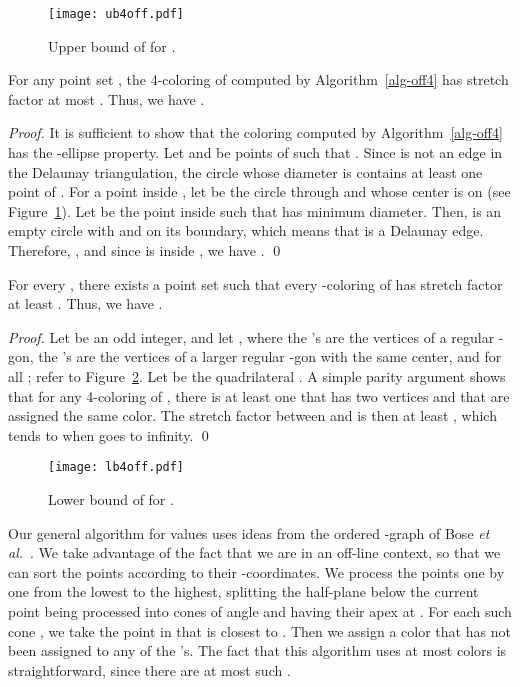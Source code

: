 \documentclass[pdftex,leqno,fleqn,12pts]{llncs}
\begin{document}
\begin{figure}
\centering\texttt{[image: ub4off.pdf]}\caption{Upper bound of  for
.}\label{fig-ub4off}
\end{figure}


\begin{lemma}    \label{prop-ub4off} 
For any point set , the 4-coloring of  computed by 
Algorithm~\ref{alg-off4} has stretch factor at most . 
Thus, we have .
\end{lemma}
\begin{proof}
It is sufficient to show that the coloring  computed by
Algorithm~\ref{alg-off4} has the -ellipse property. 
Let  and  be points of  such that . Since 
is not an edge in the Delaunay triangulation, the circle  whose 
diameter is  contains at least one point of . For a point  
inside , let  be the circle through  and  whose center 
is on  (see Figure~\ref{fig-ub4off}). Let  be the point inside 
 such that  has minimum diameter. Then,  is an empty
circle with  and  on its boundary, which means that 
is a Delaunay edge. Therefore, , and since  is
inside , we have .
\qed 
\end{proof}

\begin{lemma} 
For every , there exists a point set  such that every
-coloring of  has stretch factor at least .
Thus, we have .
\end{lemma}
\begin{proof} 
Let  be an odd integer, and let 
, where the 's are the 
vertices of a regular -gon, the 's are the vertices of a larger 
regular -gon with the same center, and  for 
all ; refer to Figure~\ref{fig-lb4off}.
Let  be the quadrilateral . A simple 
parity argument shows that for any 4-coloring of , there is at 
least one  that has two vertices  and  that are assigned the 
same color. The stretch factor between  and  is then at least
, which tends to  when  goes to
infinity.
\qed 
\end{proof}


\begin{figure}
\centering\texttt{[image: lb4off.pdf]}\caption{Lower bound of
 for .}\label{fig-lb4off}
\end{figure}

Our general algorithm for values  uses ideas from the ordered 
-graph of Bose \emph{et al.}~\cite{bose04a}. 
We take advantage of the fact that we are in an off-line context, so that 
we can sort the points according to their -coordinates. We process 
the points one by one from the lowest to the highest, splitting the 
half-plane below the current point  being processed into  cones 
of angle  and having their apex at . 
For each such cone , we take the point  in  that is 
closest to . Then we assign  a color that has not been assigned to 
any of the 's. The fact that this algorithm uses at most  colors 
is straightforward, since there are at most  such . 
\end{document}
